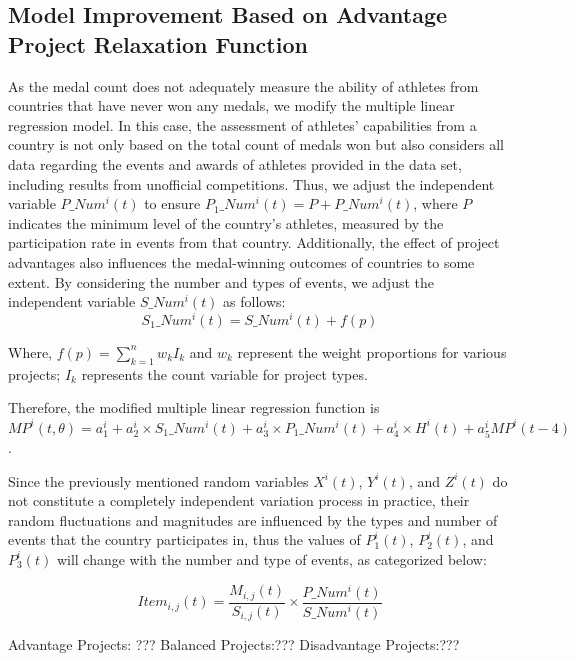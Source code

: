 \documentclass{mcmthesis}
\begin{document}
\subsection{Model Improvement Based on Advantage Project Relaxation Function}
As the medal count does not adequately measure the ability of athletes from countries that have never won any medals, we modify the multiple linear regression model. In this case, the assessment of athletes' capabilities from a country is not only based on the total count of medals won but also considers all data regarding the events and awards of athletes provided in the data set, including results from unofficial competitions. Thus, we adjust the independent variable $P\_Num^{i}(t)$ to ensure $P_{1}\_Num^{i}(t) = P+P\_Num^{i}(t)$, where $P$ indicates the minimum level of the country's athletes, measured by the participation rate in events from that country. Additionally, the effect of project advantages also influences the medal-winning outcomes of countries to some extent. By considering the number and types of events, we adjust the independent variable $S\_Num^{i}(t)$ as follows:
\begin{equation}
S_{1}\_Num^{i}(t) = S\_Num^{i}(t) + f(p)
\end{equation}

Where, $f(p) = \sum_{k=1}^{n}w_{k}I_{k}$ and $w_{k}$ represent the weight proportions for various projects; $I_{k}$ represents the count variable for project types.

Therefore, the modified multiple linear regression function is $MP^{i}(t, \theta) = a_{1}^{i}+a_{2}^{i}\times S_{1}\_Num^{i}(t) + a_{3}^{i}\times P_{1}\_Num^{i}(t) + a_{4}^{i}\times H^{i}(t) + a_{5}^{i}MP^{i}(t-4)$.

Since the previously mentioned random variables $X^{i}(t)$, $Y^{i}(t)$, and $Z^{i}(t)$ do not constitute a completely independent variation process in practice, their random fluctuations and magnitudes are influenced by the types and number of events that the country participates in, thus the values of $P_{1}^{i}(t)$, $P_{2}^{i}(t)$, and $P_{3}^{i}(t)$ will change with the number and type of events, as categorized below:

\begin{equation}
Item_{i, j}(t) = \frac{M_{i, j}(t)}{S_{i, j}(t)} \times \frac{P\_Num^{i}(t)}{S\_Num^{i}(t)}
\end{equation}

Advantage Projects: ???
Balanced Projects:???
Disadvantage Projects:???
\end{document}
